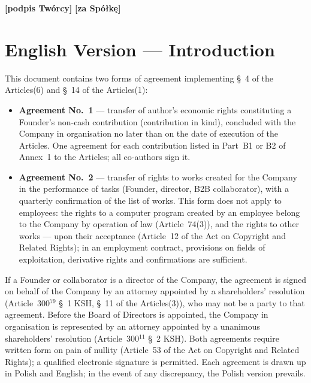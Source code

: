 \documentclass[12pt,a4paper]{report}
\newcommand{\field}[1]{\textbf{[#1]}}
\newcommand{\USen}[1]{\S~#1 of the Articles}
\begin{document}
\field{podpis Twórcy} \hfill \field{za Spółkę}


\newpage
{}

\chapter*{English Version --- Introduction}

This document contains two forms of agreement implementing \USen{4}(6) and \USen{14}(1):

\begin{itemize}
  \item \textbf{Agreement No.~1} --- transfer of author's economic rights constituting a Founder's non-cash contribution (contribution in kind), concluded with the Company in organisation no later than on the date of execution of the Articles. One agreement for each contribution listed in Part~B1 or B2 of Annex~1 to the Articles; all co-authors sign it.
  \item \textbf{Agreement No.~2} --- transfer of rights to works created for the Company in the performance of tasks (Founder, director, B2B collaborator), with a quarterly confirmation of the list of works. This form does not apply to employees: the rights to a computer program created by an employee belong to the Company by operation of law (Article~74(3)), and the rights to other works --- upon their acceptance (Article~12 of the Act on Copyright and Related Rights); in an employment contract, provisions on fields of exploitation, derivative rights and confirmations are sufficient.
\end{itemize}

If a Founder or collaborator is a director of the Company, the agreement is signed on behalf of the Company by an attorney appointed by a shareholders' resolution (Article~300$^{79}$ \S~1 KSH, \USen{11}(3)), who may not be a party to that agreement. Before the Board of Directors is appointed, the Company in organisation is represented by an attorney appointed by a unanimous shareholders' resolution (Article~300$^{11}$ \S~2 KSH). Both agreements require written form on pain of nullity (Article~53 of the Act on Copyright and Related Rights); a qualified electronic signature is permitted. Each agreement is drawn up in Polish and English; in the event of any discrepancy, the Polish version prevails.
\end{document}
